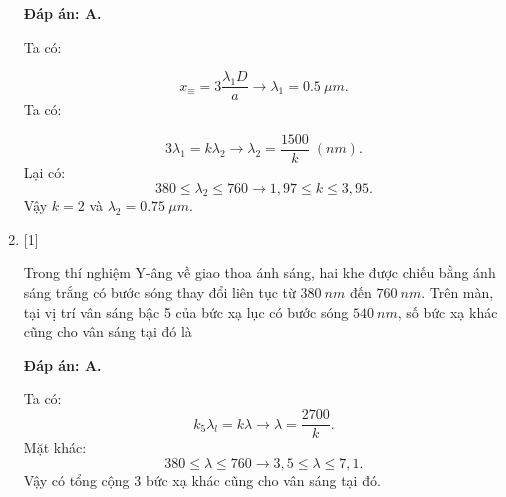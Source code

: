 \begin{enumerate}[label=\bfseries Câu \arabic*:]
	\loigiai
	{		\textbf{Đáp án: A.}
		
		Ta có:
		
		$$
		x_{\equiv} = 3 \dfrac{\lambda_{1} D}{a} \rightarrow \lambda_{1} = \SI{0,5}{\mu m}.
		$$
		Ta có:
		
		$$
		3 \lambda_{1} = k \lambda_{2} \rightarrow \lambda_{2} = \dfrac{1500}{k} \; (\si{nm}).
		$$
		Lại có:
		$$
		380 \leq \lambda_{2} \leq 760 \rightarrow 1,97 \leq k \leq 3,95.
		$$
		Vậy $k = 2$ và $\lambda_{2} = \SI{0,75}{\mu m}$.
	}   
	
	\item {} [1]
	\cauhoi
	{Trong thí nghiệm Y-âng về giao thoa ánh sáng, hai khe được chiếu bằng ánh sáng trắng có bước sóng thay đổi liên tục từ $\SI{380}{nm}$ đến $\SI{760}{nm}$. Trên màn, tại vị trí vân sáng bậc 5 của bức xạ lục có bước sóng $\SI{540}{nm}$, số bức xạ khác cũng cho vân sáng tại đó là
	}
	
	\loigiai
	{		\textbf{Đáp án: A.}
		
		Ta có:
		$$
		k_{5}\lambda_{l} = k \lambda \rightarrow \lambda = \dfrac{2700}{k} .
		$$
		Mặt khác:
		$$
		380 \leq \lambda \leq 760 \rightarrow 3,5 \leq \lambda \leq 7,1.
		$$
		Vậy có tổng cộng 3 bức xạ khác cũng cho vân sáng tại đó.
	}
	
	
\end{enumerate}

